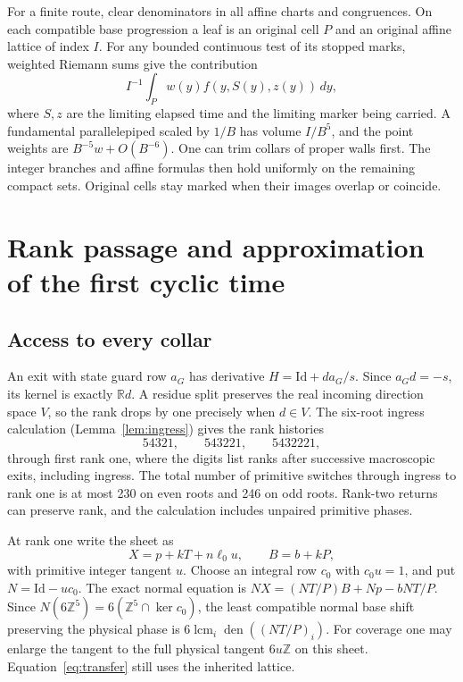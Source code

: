 \documentclass[11pt,reqno]{amsart}
\theoremstyle{definition}
\newcommand{\Z}{\mathbb Z}
\newcommand{\R}{\mathbb R}
\newcommand{\Id}{\mathrm{Id}}
\begin{document}
For a finite route, clear denominators in all affine charts and
congruences. On each compatible base progression a leaf is an
original cell \(P\) and an original affine lattice of index \(I\).
For any bounded continuous test of its stopped marks, weighted Riemann
sums give the contribution
\begin{equation}\label{eq:transfer}
 I^{-1}\int_P w(y) f(y,S(y),z(y))\,dy ,
\end{equation}
where \(S,z\) are the limiting elapsed time and the limiting marker
being carried. A fundamental parallelepiped scaled by \(1/B\) has
volume \(I/B^5\), and the point weights are \(B^{-5}w+O(B^{-6})\).
One can trim collars of proper walls first. The integer branches and
affine formulas then hold uniformly on the remaining compact sets.
Original cells stay marked when their images overlap or coincide.

\section{Rank passage and approximation of the first cyclic time}\label{sec:passage}

\subsection{Access to every collar}\label{sec:collar}
An exit with state guard row \(a_G\) has derivative
\(H=\Id+d a_G/s\). Since \(a_G d=-s\), its kernel is exactly \(\R d\).
A residue split preserves the real incoming direction space \(V\), so
the rank drops by one precisely when \(d\in V\). The six-root ingress
calculation (Lemma~\ref{lem:ingress}) gives the rank histories
\[
 54321,\qquad 543221,\qquad 5432221,
\]
through first rank one, where the digits list ranks after successive
macroscopic exits, including ingress. The total number of primitive
switches through ingress to rank one is at most 230 on even roots
and 246 on odd roots. Rank-two returns can preserve rank, and the
calculation includes unpaired primitive phases.

At rank one write the sheet as
\[
 X=p+kT+n\ell_0 u,\qquad B=b+kP,
\]
with primitive integer tangent \(u\). Choose an integral row \(c_0\)
with \(c_0u=1\), and put \(N=\Id-uc_0\). The exact normal equation is
\(NX=(NT/P)B+Np-bNT/P\). Since \(N(6\Z^5)=6(\Z^5\cap\ker c_0)\),
the least compatible normal base shift preserving the physical phase
is \(6\operatorname{lcm}_i\operatorname{den}((NT/P)_i)\).
For coverage one may enlarge the tangent to the full physical
tangent \(6u\Z\) on this sheet. Equation~\eqref{eq:transfer} still
uses the inherited lattice.
\end{document}
